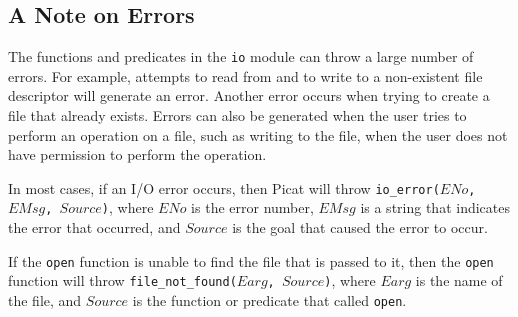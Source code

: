 {\subsection{A Note on Errors}
The functions and predicates in the \texttt{io} module can throw a large number of errors.  For example, attempts to read from and to write to a non-existent file descriptor will generate an error.  Another error occurs when trying to create a file that already exists.  Errors can also be generated when the user tries to perform an operation on a file, such as writing to the file, when the user does not have permission to perform the operation.

In most cases, if an I/O error occurs, then Picat will throw \texttt{io\_error($ENo$, $EMsg$, $Source$)}, where $ENo$ is the error number, $EMsg$ is a string that indicates the error that occurred, and $Source$ is the goal that caused the error to occur.  

If the \texttt{open} function is unable to find the file that is passed to it, then the \texttt{open} function will throw \texttt{file\_not\_found($Earg$, $Source$)}, where $Earg$ is the name of the file, and $Source$ is the function or predicate that called \texttt{open}. 
}
\ignore{

}
